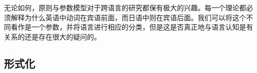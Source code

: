 无论如何，原则与参数模型对于跨语言的研究都保有极大的兴趣。每一个理论都必须解释为什么英语中动词在宾语前面，而日语中则在宾语后面。我们可以将这个不同看作是一个参数，并将语言进行相应的分类，但是这是否真正地与语言认知是有关系的还是存在很大的疑问的。

\subsection{形式化}
\label{sec-formalization-gb}


